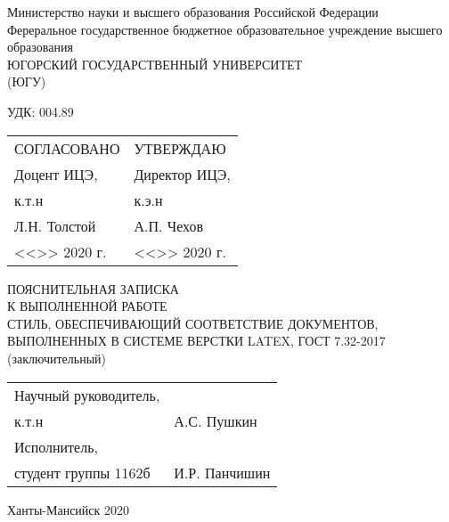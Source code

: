 \newcommand{\signplace}{\underline{\hspace{40mm}}}
\newcommand{\dateblank}{%
    <<\underline{\hspace{10mm}}>> \underline{\hspace{30mm}} 2020 г.%
}
\newlength{\twointerv}\setlength{\twointerv}{28.34pt}

\begin{titlepage}
    \singlespacing
    \setlength{\parindent}{0pt}
    \begin{center}
        Министерство науки и высшего образования Российской Федерации\\
        Фереральное государственное бюджетное образовательное учреждение
высшего образования\\
        ЮГОРСКИЙ ГОСУДАРСТВЕННЫЙ УНИВЕРСИТЕТ\\
        (ЮГУ)
    \end{center}

    \vspace{\twointerv}

    УДК: 004.89

    \vspace{\twointerv}

    \setlength{\tabcolsep}{0pt}
    \begin{tabular}{N{0.5\textwidth}N{80mm}}
        СОГЛАСОВАНО                 & УТВЕРЖДАЮ\\
        Доцент ИЦЭ,                 & Директор ИЦЭ,\\
        к.т.н                       & к.э.н\\
        \signplace{} Л.Н. Толстой   & \signplace{} А.П. Чехов\\
        \dateblank{}                & \dateblank{}
    \end{tabular}

    \vspace{\twointerv}

    \begin{center}
        ПОЯСНИТЕЛЬНАЯ ЗАПИСКА\\
        К ВЫПОЛНЕННОЙ РАБОТЕ\\
        \vspace{\twointerv}
        СТИЛЬ, ОБЕСПЕЧИВАЮЩИЙ СООТВЕТСТВИЕ ДОКУМЕНТОВ, ВЫПОЛНЕННЫХ В СИСТЕМЕ
ВЕРСТКИ LATEX, ГОСТ 7.32-2017\\
        (заключительный)
    \end{center}

    \vfill

    \begin{tabular}{N{70mm}N{80mm}}
        Научный руководитель,\\
        к.т.н & \signplace{} А.С. Пушкин\\
        \vspace{5mm}
        Исполнитель,\\
        студент группы 1162б & \signplace{} И.Р. Панчишин
    \end{tabular}

    \vfill

    \begin{center}
        Ханты-Мансийск 2020
    \end{center}
\end{titlepage}
